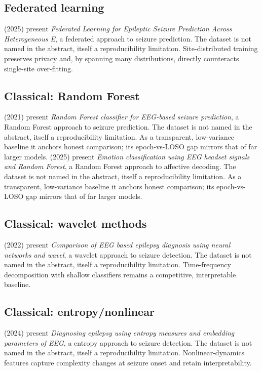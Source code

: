 \subsection{Federated learning}
\citet{ep250808159} (2025) present \emph{Federated Learning for Epileptic Seizure Prediction Across Heterogeneous E}, a federated approach to seizure prediction. The dataset is not named in the abstract, itself a reproducibility limitation. Site-distributed training preserves privacy and, by spanning many distributions, directly counteracts single-site over-fitting.

\subsection{Classical: Random Forest}
\citet{ep210604510} (2021) present \emph{Random Forest classifier for EEG-based seizure prediction}, a Random Forest approach to seizure prediction. The dataset is not named in the abstract, itself a reproducibility limitation. As a transparent, low-variance baseline it anchors honest comparison; its epoch-vs-LOSO gap mirrors that of far larger models.
\citet{ep251222333} (2025) present \emph{Emotion classification using EEG headset signals and Random Forest}, a Random Forest approach to affective decoding. The dataset is not named in the abstract, itself a reproducibility limitation. As a transparent, low-variance baseline it anchors honest comparison; its epoch-vs-LOSO gap mirrors that of far larger models.

\subsection{Classical: wavelet methods}
\citet{ep220404488} (2022) present \emph{Comparison of EEG based epilepsy diagnosis using neural networks and wavel}, a wavelet approach to seizure detection. The dataset is not named in the abstract, itself a reproducibility limitation. Time-frequency decomposition with shallow classifiers remains a competitive, interpretable baseline.

\subsection{Classical: entropy/nonlinear}
\citet{ep240107258} (2024) present \emph{Diagnosing epilepsy using entropy measures and embedding parameters of EEG}, a entropy approach to seizure detection. The dataset is not named in the abstract, itself a reproducibility limitation. Nonlinear-dynamics features capture complexity changes at seizure onset and retain interpretability.


